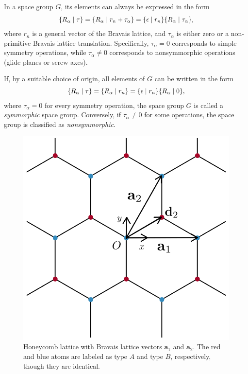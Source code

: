 \begin{definition} \label{def:symmorphic}
In a space group \(G\), its elements can always be expressed in the form
\begin{equation} \label{eq:decomp_space_group_elems_symmorphic_def}
\{ R_\alpha \mid \tau \} = \{ R_\alpha \mid r_n + \tau_\alpha \} = \{ \epsilon \mid r_n \} \{ R_\alpha \mid \tau_\alpha \},
\end{equation}
where \(r_n\) is a general vector of the Bravais lattice, and \(\tau_\alpha\) is either zero or a non-primitive Bravais lattice translation. Specifically, \(\tau_\alpha = 0\) corresponds to simple symmetry operations, while \(\tau_\alpha \neq 0\) corresponds to nonsymmorphic operations (glide planes or screw axes).

If, by a suitable choice of origin, all elements of \(G\) can be written in the form
\begin{equation} \label{eq:symmorphic_definition}
\{ R_\alpha \mid \tau \} = \{ R_\alpha \mid r_n \} = \{ \epsilon \mid r_n \} \{ R_\alpha \mid 0 \},
\end{equation}
where \(\tau_\alpha = 0\) for every symmetry operation, the space group \(G\) is called a \textit{symmorphic} space group. Conversely, if \(\tau_\alpha \neq 0\) for some operations, the space group is classified as \textit{nonsymmorphic}.
\end{definition}

\begin{figure}[H]
\centering
\includegraphics[width=0.55\linewidth]{fig/honeycomb_coordinates.png}
\caption{Honeycomb lattice with Bravais lattice vectors \(\mathbf{a}_1\) and \(\mathbf{a}_2\). The red and blue atoms are labeled as type $A$ and type $B$, respectively, though they are identical.}
\label{fig:honeycomb_coordinates}
\end{figure}

